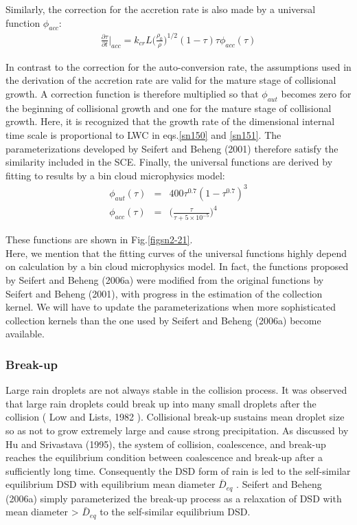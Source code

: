 Similarly, the correction for the accretion rate is also made by a universal function $\phi_{acc}$:
\begin{eqnarray}
\frac{\partial \tau}{\partial t}\Bigr|_{acc}=k_{cr}L\bigl(\frac{\rho_{0}}{\rho}\bigr)^{1/2}(1-\tau)\tau\phi_{acc}(\tau)\label{sn151}
\end{eqnarray}

In contrast to the correction for the auto-conversion rate, the assumptions used in the derivation of the accretion rate are valid for the mature stage of collisional growth. A correction function is therefore multiplied so that $\phi_{aut}$ becomes zero for the beginning of collisional growth and one for the mature stage of collisional growth. Here, it is recognized that the growth rate of the dimensional internal time scale is proportional to LWC in eqs.\ref{sn150} and \ref{sn151}. The parameterizations developed by Seifert and Beheng (2001) therefore satisfy the similarity included in the SCE. Finally, the universal functions are derived by fitting to results by a bin cloud microphysics model:
\begin{eqnarray}
\phi_{aut}(\tau)&=&400\tau^{0.7}(1-\tau^{0.7})^{3}\label{152}\\
\phi_{acc}(\tau)&=&\bigl(\frac{\tau}{\tau+5\times 10^{-5}}\bigr)^{4}\label{153}
\end{eqnarray}

These functions are shown in Fig.\ref{figsn2-21}.\\
Here, we mention that the fitting curves of the universal functions highly depend on calculation by a bin cloud microphysics model. In fact, the functions proposed by Seifert and Beheng (2006a) were modified from the original functions by Seifert and Beheng (2001), with progress in the estimation of the collection kernel. We will have to update the parameterizations when more sophisticated collection kernels than the one used by Seifert and Beheng (2006a) become available.

\subsubsection{Break-up}
Large rain droplets are not always stable in the collision process. It was observed that large rain droplets could break up into many small droplets after the collision ( Low and Lists, 1982 ). Collisional break-up sustains mean droplet size so as not to grow extremely large and cause strong precipitation. As discussed by Hu and Srivastava (1995), the system of collision, coalescence, and break-up reaches the equilibrium condition between coalescence and break-up after a sufficiently long time. Consequently the DSD form of rain is led to the self-similar equilibrium DSD with equilibrium mean diameter $\bar{D}_{eq}$ . Seifert and Beheng (2006a) simply parameterized the break-up process as a relaxation of DSD with mean diameter > $\bar{D}_{eq}$ to the self-similar equilibrium DSD.

